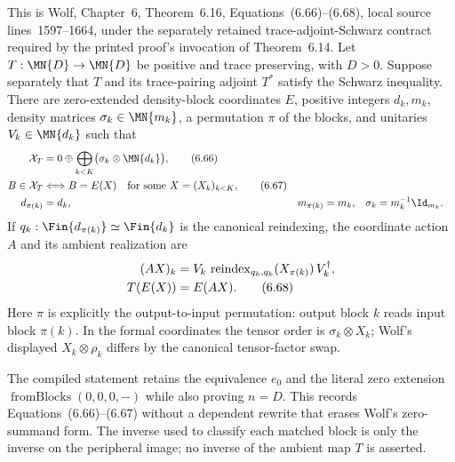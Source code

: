 \begin{theorem}
    \label{thm:wolf_6_16}
    \leanok
    This is Wolf, Chapter~6, Theorem~6.16, Equations~(6.66)--(6.68),
    local source lines~1597--1664, under the separately retained
    trace-adjoint-Schwarz contract required by the printed proof's invocation
    of Theorem~6.14.
    Let $T:\MN{D}\to\MN{D}$ be positive and trace preserving, with $D>0$.
    Suppose separately that $T$ and its trace-pairing adjoint $T^*$ satisfy
    the Schwarz inequality. There are zero-extended density-block
    coordinates $E$, positive integers $d_k,m_k$, density matrices
    $\sigma_k\in\MN{m_k}$, a permutation $\pi$ of the blocks, and unitaries
    $V_k\in\MN{d_k}$ such that
    \begin{align}
        \mathcal X_T
          &=0\oplus\bigoplus_{k<K}
              \bigl(\sigma_k\otimes\MN{d_k}\bigr),
              \tag{6.66}\label{eq:wolf_6_16_density_blocks}\\
        B\in\mathcal X_T
          &\Longleftrightarrow
            B=E(X)\quad\text{for some }X=(X_k)_{k<K},
              \tag{6.67}\label{eq:wolf_6_16_coordinates}\\
        d_{\pi(k)}&=d_k,
        &m_{\pi(k)}&=m_k,
        &\sigma_k&=m_k^{-1}\Id_{m_k}.
        \notag
    \end{align}
    If $q_k:\Fin{d_{\pi(k)}}\simeq\Fin{d_k}$ is the canonical reindexing,
    the coordinate action $A$ and its ambient realization are
    \begin{align}
        (AX)_k
          &=V_k\,\operatorname{reindex}_{q_k,q_k}
              (X_{\pi(k)})\,V_k^\dagger,
          \notag\\
        T(E(X))&=E(AX).
          \tag{6.68}\label{eq:wolf_6_16_action}
    \end{align}
    Here $\pi$ is explicitly the output-to-input permutation: output block
    $k$ reads input block $\pi(k)$. In the formal coordinates the tensor
    order is $\sigma_k\otimes X_k$; Wolf's displayed
    $X_k\otimes\rho_k$ differs by the canonical tensor-factor swap.

    The compiled statement retains the equivalence $e_0$ and the literal
    zero extension $\operatorname{fromBlocks}(0,0,0,-)$ while also proving
    $n=D$. This records Equations~(6.66)--(6.67) without a dependent rewrite
    that erases Wolf's zero-summand form. The inverse used to classify each
    matched block is only the inverse on the peripheral image; no inverse of
    the ambient map $T$ is asserted.
\end{theorem}


